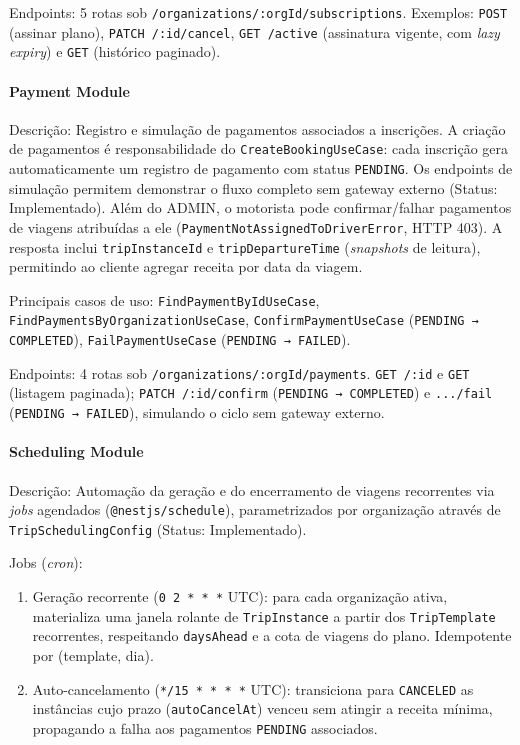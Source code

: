 Endpoints: 5 rotas sob \texttt{/organizations/:orgId/subscriptions}. Exemplos: \texttt{POST} (assinar plano), \texttt{PATCH /:id/cancel}, \texttt{GET /active} (assinatura vigente, com \textit{lazy expiry}) e \texttt{GET} (histórico paginado).

\paragraph{Payment Module}

Descrição: Registro e simulação de pagamentos associados a inscrições. A criação de pagamentos é responsabilidade do \texttt{CreateBookingUseCase}: cada inscrição gera automaticamente um registro de pagamento com status \texttt{PENDING}. Os endpoints de simulação permitem demonstrar o fluxo completo sem gateway externo (Status: Implementado). Além do ADMIN, o motorista pode confirmar/falhar pagamentos de viagens atribuídas a ele (\texttt{PaymentNotAssignedToDriverError}, HTTP 403). A resposta inclui \texttt{tripInstanceId} e \texttt{tripDepartureTime} (\textit{snapshots} de leitura), permitindo ao cliente agregar receita por data da viagem.

Principais casos de uso: \texttt{FindPaymentByIdUseCase}, \texttt{FindPaymentsByOrganizationUseCase}, \texttt{ConfirmPaymentUseCase} (\texttt{PENDING → COMPLETED}), \texttt{FailPaymentUseCase} (\texttt{PENDING → FAILED}).

Endpoints: 4 rotas sob \texttt{/organizations/:orgId/payments}. \texttt{GET /:id} e \texttt{GET} (listagem paginada); \texttt{PATCH /:id/confirm} (\texttt{PENDING → COMPLETED}) e \texttt{.../fail} (\texttt{PENDING → FAILED}), simulando o ciclo sem gateway externo.

\paragraph{Scheduling Module}

Descrição: Automação da geração e do encerramento de viagens recorrentes via \textit{jobs} agendados (\texttt{@nestjs/schedule}), parametrizados por organização através de \texttt{TripSchedulingConfig} (Status: Implementado).

Jobs (\textit{cron}):
\begin{enumerate}
\item Geração recorrente (\texttt{0 2 * * *} UTC): para cada organização ativa, materializa uma janela rolante de \texttt{TripInstance} a partir dos \texttt{TripTemplate} recorrentes, respeitando \texttt{daysAhead} e a cota de viagens do plano. Idempotente por (template, dia).
\item Auto-cancelamento (\texttt{*/15 * * * *} UTC): transiciona para \texttt{CANCELED} as instâncias cujo prazo (\texttt{autoCancelAt}) venceu sem atingir a receita mínima, propagando a falha aos pagamentos \texttt{PENDING} associados.
\end{enumerate}

